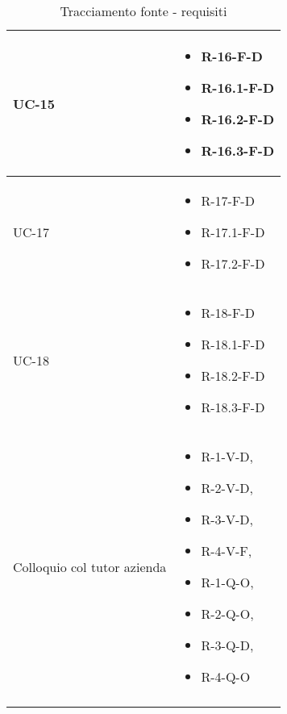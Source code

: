 \begin{center}
\begin{longtable}{| C{6cm} |C{6cm}|}
    UC-15 &
    \begin{itemize}
        \item R-16-F-D
        \item R-16.1-F-D
        \item R-16.2-F-D
        \item R-16.3-F-D
    \end{itemize}\\\hline
    UC-17 &
    \begin{itemize}
        \item R-17-F-D
        \item R-17.1-F-D
        \item R-17.2-F-D
    \end{itemize}\\\hline
    UC-18 &
    \begin{itemize}
        \item R-18-F-D
        \item R-18.1-F-D
        \item R-18.2-F-D
        \item R-18.3-F-D
    \end{itemize}\\\hline
    Colloquio col tutor azienda &
    \begin{itemize}
        \item R-1-V-D,
        \item R-2-V-D,
        \item R-3-V-D,
        \item R-4-V-F,
        \item R-1-Q-O,
        \item R-2-Q-O,
        \item R-3-Q-D,
        \item R-4-Q-O
    \end{itemize} \\\hline
    \caption{Tracciamento fonte - requisiti}
    \end{longtable}
\end{center}

